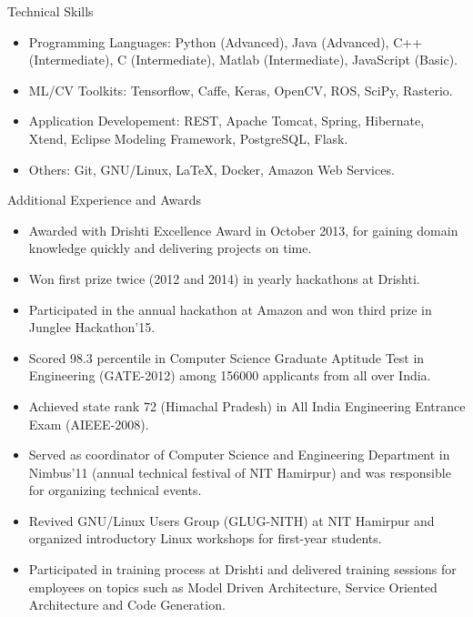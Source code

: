 \documentclass[]{mcdowellcv}
\begin{document}
    \begin{cvsection}{Technical Skills}
        \begin{cvsubsection}{}{}{}    
            \begin{itemize}
                \item Programming Languages: Python (Advanced), Java (Advanced), C++ (Intermediate), C (Intermediate), Matlab (Intermediate), JavaScript (Basic).
                \item ML/CV Toolkits: Tensorflow, Caffe, Keras, OpenCV, ROS, SciPy, Rasterio.
                \item Application Developement: REST, Apache Tomcat, Spring, Hibernate, Xtend, Eclipse Modeling Framework, PostgreSQL, Flask.
                \item Others: Git, GNU/Linux, LaTeX, Docker, Amazon Web Services.
            \end{itemize}
        \end{cvsubsection}
    \end{cvsection}
    
    \begin{cvsection}{Additional Experience and Awards}
        \begin{cvsubsection}{}{}{}    
            \begin{itemize}
                \item Awarded with Drishti Excellence Award in October 2013, for gaining domain knowledge quickly and delivering projects on time.
                \item Won first prize twice (2012 and 2014) in yearly hackathons at Drishti.
                \item Participated in the annual hackathon at Amazon and won third prize in Junglee Hackathon’15.
                \item Scored 98.3 percentile in Computer Science Graduate Aptitude Test in Engineering (GATE-2012) among 156000 applicants from all over India.
                \item Achieved state rank 72 (Himachal Pradesh) in All India Engineering Entrance Exam (AIEEE-2008).
                \item Served as coordinator of Computer Science and Engineering Department in Nimbus'11 (annual technical festival of NIT Hamirpur) and was responsible for organizing technical events.
                \item Revived GNU/Linux Users Group (GLUG-NITH) at NIT Hamirpur and organized introductory Linux workshops for first-year students.
                \item Participated in training process at Drishti and delivered training sessions for employees on topics such as Model Driven Architecture, Service Oriented Architecture and Code Generation.
            \end{itemize}
        \end{cvsubsection}
    \end{cvsection}
    
\end{document}
